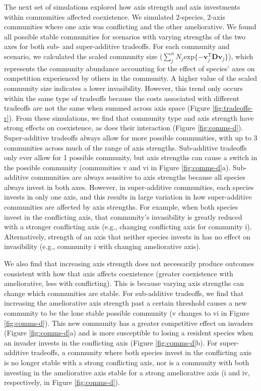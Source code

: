 The next set of simulations explored how axis strength and axis investments
within communities affected coexistence.
We simulated 2-species, 2-axis communities where one axis was conflicting
and the other ameliorative.
We found all possible stable communities for scenarios with varying 
strengths of the two axes for both sub- and super-additive tradeoffs.
For each community and scenario, we calculated the 
scaled community size
($\sum_j^n{N_j \text{exp} \{ -\mathbf{v}_{j}^{\text{T}} \mathbf{D} \mathbf{v}_j \}}$), which represents the community abundance accounting
for the effect of species' axes on competition experienced by others in the
community.
A higher value of the scaled community size indicates a lower invasibility.
However, this trend only occurs within the same type of tradeoffs
because the costs associated with different tradeoffs are not the
same when summed across axis space (Figure \ref{fig:tradeoffs-r}).
From these simulations, we find that community type and axis strength
have strong effects on coexistence, as does their interaction
(Figure \ref{fig:comms-d}).
Super-additive tradeoffs always allow for more possible communities,
with up to 3 communities across much of the range of axis strengths.
Sub-additive tradeoffs only ever allow for 1 possible community,
but axis strengths can cause a switch in the possible community
(communities v and vi in Figure \ref{fig:comms-d}a).
Sub-additive communities are always sensitive to axis strengths
because all species always invest in both axes.
However, in super-additive communities, each species invests in 
only one axis, and this results in large variation in how
super-additive communities are affected by axis strengths.
For example, when both species invest in the conflicting axis,
that community's invasibility is greatly reduced with a
stronger conflicting axis (e.g., changing conflicting axis for community i).
Alternatively, strength of an axis that neither species invests in has
no effect on invasibility (e.g., community i with changing ameliorative axis).

We also find that increasing axis strength does not necessarily produce
outcomes consistent with how that axis affects coexistence
(greater coexistence with ameliorative, less with conflicting).
This is because varying axis strengths can change which
communities are stable.
For sub-additive tradeoffs, we find that increasing the ameliorative
axis strength past a certain threshold causes a new community to 
be the lone stable possible community (v changes to vi in Figure \ref{fig:comms-d}).
This new community has a greater competitive effect on invaders
(Figure \ref{fig:comms-d}a) and is more susceptible to losing a resident
species when an invader invests in the conflicting axis
(Figure \ref{fig:comms-d}b).
For super-additive tradeoffs, a community where both species invest in
the conflicting axis is no longer stable with a strong conflicting
axis, nor is a community with both investing in the ameliorative axis
stable for a strong ameliorative axis
(i and iv, respectively, in Figure \ref{fig:comms-d}).


